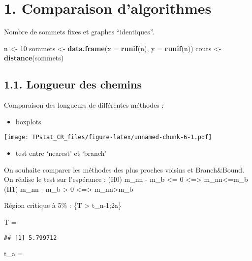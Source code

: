 \documentclass[]{article}
\newenvironment{Shaded}{\begin{snugshade}}{\end{snugshade}}
\newcommand{\DataTypeTok}[1]{\textcolor[rgb]{0.13,0.29,0.53}{#1}}
\newcommand{\DecValTok}[1]{\textcolor[rgb]{0.00,0.00,0.81}{#1}}
\newcommand{\KeywordTok}[1]{\textcolor[rgb]{0.13,0.29,0.53}{\textbf{#1}}}
\newcommand{\NormalTok}[1]{#1}
\newcommand{\StringTok}[1]{\textcolor[rgb]{0.31,0.60,0.02}{#1}}
\providecommand{\tightlist}{%
  \setlength{\itemsep}{0pt}\setlength{\parskip}{0pt}}
\begin{document}
\hypertarget{comparaison-dalgorithmes}{%
\section{1. Comparaison d'algorithmes}\label{comparaison-dalgorithmes}}

Nombre de sommets fixes et graphes ``identiques''.

\begin{Shaded}
\begin{Highlighting}[]
\NormalTok{      n <-}\StringTok{ }\DecValTok{10}
\NormalTok{sommets <-}\StringTok{ }\KeywordTok{data.frame}\NormalTok{(}\DataTypeTok{x =} \KeywordTok{runif}\NormalTok{(n), }\DataTypeTok{y =} \KeywordTok{runif}\NormalTok{(n))}
\NormalTok{  couts <-}\StringTok{ }\KeywordTok{distance}\NormalTok{(sommets)}
\end{Highlighting}
\end{Shaded}

\hypertarget{longueur-des-chemins}{%
\subsection{1.1. Longueur des chemins}\label{longueur-des-chemins}}

Comparaison des longueurs de différentes méthodes :

\begin{itemize}
\tightlist
\item
  boxplots
\end{itemize}

\texttt{[image: TPstat\_CR\_files/figure-latex/unnamed-chunk-6-1.pdf]}

\begin{itemize}
\tightlist
\item
  test entre `nearest' et `branch'
\end{itemize}

On souhaite comparer les méthodes des plus proches voisins et
Branch\&Bound. On réalise le test sur l'espérance : (H0) m\_nn - m\_b
\textless{}= 0 \textless{}=\textgreater{} m\_nn\textless{}=m\_b (H1)
m\_nn - m\_b \textgreater{} 0 \textless{}=\textgreater{}
m\_nn\textgreater{}m\_b

Région critique à 5\% : \{T \textgreater{} t\_n-1;2a\}

T =

\begin{verbatim}
## [1] 5.799712
\end{verbatim}

t\_a =
\end{document}
